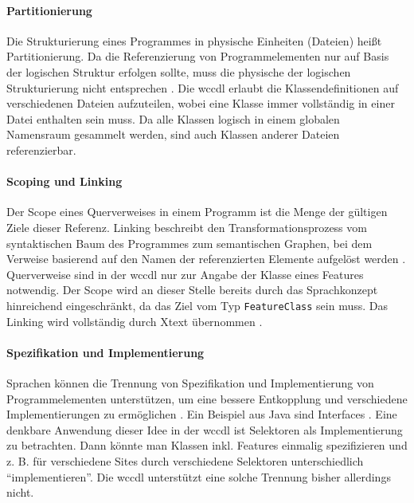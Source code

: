     \paragraph{Partitionierung}
    Die Strukturierung eines Programmes in physische Einheiten (Dateien) heißt Partitionierung.
    Da die Referenzierung von Programmelementen nur auf Basis der logischen Struktur erfolgen sollte,
    muss die physische der logischen Strukturierung nicht entsprechen
    \cite[Kapitel 5.1.2]{voelter:DslEngineering}.
    Die \gls{wccdl} erlaubt die Klassendefinitionen auf verschiedenen Dateien
    aufzuteilen, wobei eine Klasse immer vollständig in einer Datei enthalten sein muss.
    Da alle Klassen logisch in einem globalen Namensraum gesammelt werden,
    sind auch Klassen anderer Dateien referenzierbar.

    \paragraph{Scoping und Linking}
    Der Scope eines Querverweises in einem Programm ist die Menge der
    gültigen Ziele dieser Referenz.
    Linking beschreibt den Transformationsprozess vom syntaktischen Baum des Programmes
    zum semantischen Graphen, bei dem Verweise basierend auf den Namen der referenzierten
    Elemente aufgelöst werden
    \cite[Kapitel 8]{voelter:DslEngineering}.
    Querverweise sind in der \gls{wccdl} nur zur Angabe der Klasse eines Features notwendig.
    Der Scope wird an dieser Stelle bereits durch das Sprachkonzept hinreichend
    eingeschränkt, da das Ziel vom Typ
    \texttt{FeatureClass} sein muss.
    Das Linking wird vollständig durch Xtext übernommen
    \cite[Kapitel "`Language Implementation"']{xtext:documentation}.

    \paragraph{Spezifikation und Implementierung}
    Sprachen können die Trennung von Spezifikation und Implementierung von
    Programmelementen unterstützen, um eine bessere Entkopplung und verschiedene
    Implementierungen zu ermöglichen \cite[Kapitel 5.1.3]{voelter:DslEngineering}.
    Ein Beispiel aus Java sind Interfaces \cite[Kapitel 9]{oracle:javaSpec}.
    Eine denkbare Anwendung dieser Idee in der \gls{wccdl} ist Selektoren als
    Implementierung zu betrachten. Dann könnte man Klassen inkl. Features einmalig spezifizieren
    und z. B. für verschiedene Sites durch verschiedene Selektoren unterschiedlich "`implementieren"'.
    Die \gls{wccdl} unterstützt eine solche Trennung bisher allerdings nicht.

